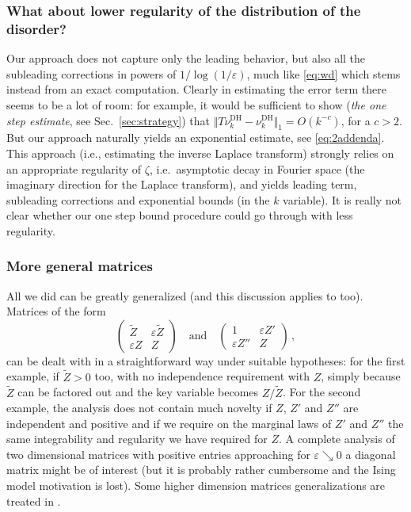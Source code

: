 \documentclass[reqno,11pt]{amsart}
\numberwithin{equation}{section}
\newcommand{\gep}{\varepsilon}       %
\newcommand{\gz}{\zeta}
\newcommand{\gs}{\sigma}
\begin{document}
\subsubsection{What about lower regularity of the distribution of the disorder?}
Our approach does not capture only the leading behavior, but also all the  subleading corrections in powers of 
$1/\log(1/\gep)$,  much like \eqref{eq:wd} which stems instead from an exact computation. 
Clearly in estimating the error term there seems to be a lot of room: for example, it would be sufficient to show (\emph{the one step estimate}, see Sec.~\ref{sec:strategy})
that $\Vert T \nu^{\textrm{DH}}_k-\nu^{\textrm{DH}}_k\Vert_1 =O(k^{-c})$, for a $c>2$. But our approach naturally yields an exponential estimate, see \eqref{eq:2addenda}. This approach 
(i.e., estimating the inverse  Laplace transform) strongly relies on an appropriate regularity of $\gz$, i.e.\ asymptotic decay in Fourier space (the imaginary direction for the Laplace transform), and  yields leading term, subleading corrections and 
exponential bounds (in the $k$ variable). It is really not clear whether our one step bound procedure could go through with less regularity.  



     
\subsubsection{More general matrices}
All we did can be greatly generalized (and this discussion applies to \cite{cf:GGG} too).  Matrices of the form
\begin{equation} 
\begin{pmatrix}
\widetilde Z& \gep \widetilde Z\\ 
\gep Z  & Z
\end{pmatrix} \ \ \ \text{ and } \ \ \
\begin{pmatrix}
1& \gep Z'\\ 
\gep Z''  & Z
\end{pmatrix}\, , 
\end{equation}
can be dealt with in a straightforward way under suitable hypotheses: for the first example, if  
$\widetilde Z>0$ too, with no independence requirement with $Z$,  simply because $\widetilde Z$ can be factored out and the key variable becomes $Z/ \widetilde Z$. For the second example, the analysis does not contain much novelty if 
$Z$, $Z'$ and $Z''$ are independent and positive and if we require on  the marginal laws of $Z'$ and $Z''$ the same integrability and regularity we have required for $Z$. A complete analysis of two dimensional matrices with positive entries approaching for $\gep\searrow 0$ 
a diagonal matrix might be of interest (but it is probably rather cumbersome and the Ising model motivation is lost). Some   higher dimension matrices generalizations  are treated in \cite[App.~A]{cf:benjamin}.
\end{document}
